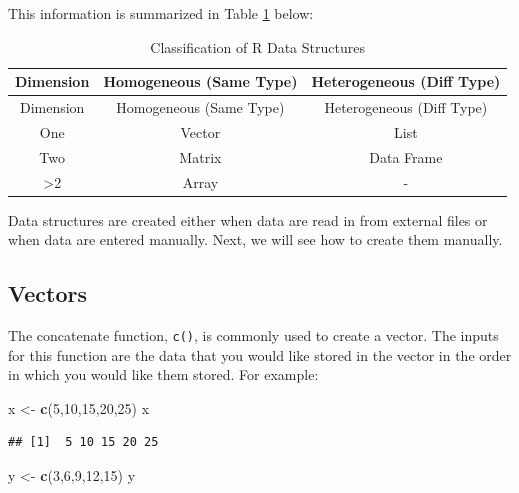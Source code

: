 \documentclass[
]{book}
\newenvironment{Shaded}{\begin{snugshade}}{\end{snugshade}}
\newcommand{\DecValTok}[1]{\textcolor[rgb]{0.00,0.00,0.81}{#1}}
\newcommand{\FunctionTok}[1]{\textcolor[rgb]{0.13,0.29,0.53}{\textbf{#1}}}
\newcommand{\NormalTok}[1]{#1}
\newcommand{\OtherTok}[1]{\textcolor[rgb]{0.56,0.35,0.01}{#1}}
\theoremstyle{definition}
\theoremstyle{definition}
\theoremstyle{definition}
\theoremstyle{definition}
\theoremstyle{remark}
\begin{document}
This information is summarized in Table \ref{tab:structures} below:

\begin{longtable}[]{@{}ccc@{}}
\caption{\label{tab:structures} Classification of R Data Structures}\tabularnewline
\toprule\noalign{}
Dimension & Homogeneous (Same Type) & Heterogeneous (Diff Type) \\
\midrule\noalign{}
\endfirsthead
\toprule\noalign{}
Dimension & Homogeneous (Same Type) & Heterogeneous (Diff Type) \\
\midrule\noalign{}
\endhead
\bottomrule\noalign{}
\endlastfoot
One & Vector & List \\
Two & Matrix & Data Frame \\
\textgreater2 & Array & - \\
\end{longtable}

Data structures are created either when data are read in from external files or when data are entered manually. Next, we will see how to create them manually.

\hypertarget{vec}{%
\subsection{Vectors}\label{vec}}

The concatenate function, \texttt{c()}, is commonly used to create a vector. The inputs for this function are the data that you would like stored in the vector in the order in which you would like them stored. For example:

\begin{Shaded}
\begin{Highlighting}[]
\NormalTok{x }\OtherTok{\textless{}{-}} \FunctionTok{c}\NormalTok{(}\DecValTok{5}\NormalTok{,}\DecValTok{10}\NormalTok{,}\DecValTok{15}\NormalTok{,}\DecValTok{20}\NormalTok{,}\DecValTok{25}\NormalTok{)}
\NormalTok{x}
\end{Highlighting}
\end{Shaded}

\begin{verbatim}
## [1]  5 10 15 20 25
\end{verbatim}

\begin{Shaded}
\begin{Highlighting}[]
\NormalTok{y }\OtherTok{\textless{}{-}} \FunctionTok{c}\NormalTok{(}\DecValTok{3}\NormalTok{,}\DecValTok{6}\NormalTok{,}\DecValTok{9}\NormalTok{,}\DecValTok{12}\NormalTok{,}\DecValTok{15}\NormalTok{)}
\NormalTok{y}
\end{Highlighting}
\end{Shaded}
\end{document}
